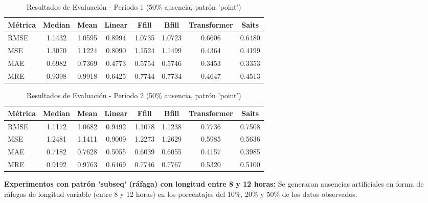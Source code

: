 \begin{table}[htbp]
\centering
\caption{Resultados de Evaluación - Periodo 1 (50\% ausencia, patrón 'point')}
\label{tab:poqueira_50_point_per1}
\begin{tabular}{l*{7}{S[table-format=1.4]}}
\toprule
\textbf{Métrica} & \textbf{Median} & \textbf{Mean} & \textbf{Linear} & \textbf{Ffill} & \textbf{Bfill} & \textbf{Transformer} & \textbf{Saits} \\
\midrule
RMSE & 1.1432 & 1.0595 & 0.8994 & 1.0735 & 1.0723 & 0.6606 & 0.6480 \\
MSE  & 1.3070 & 1.1224 & 0.8090 & 1.1524 & 1.1499 & 0.4364 & 0.4199 \\
MAE  & 0.6982 & 0.7369 & 0.4773 & 0.5754 & 0.5746 & 0.3453 & 0.3353 \\
MRE  & 0.9398 & 0.9918 & 0.6425 & 0.7744 & 0.7734 & 0.4647 & 0.4513 \\
\bottomrule
\end{tabular}
\end{table}

\begin{table}[htbp]
\centering
\caption{Resultados de Evaluación - Periodo 2 (50\% ausencia, patrón 'point')}
\label{tab:poqueira_50_point_per2}
\begin{tabular}{l*{7}{S[table-format=1.4]}}
\toprule
\textbf{Métrica} & \textbf{Median} & \textbf{Mean} & \textbf{Linear} & \textbf{Ffill} & \textbf{Bfill} & \textbf{Transformer} & \textbf{Saits} \\
\midrule
RMSE & 1.1172 & 1.0682 & 0.9492 & 1.1078 & 1.1238 & 0.7736 & 0.7508 \\
MSE  & 1.2481 & 1.1411 & 0.9009 & 1.2273 & 1.2629 & 0.5985 & 0.5636 \\
MAE  & 0.7182 & 0.7628 & 0.5055 & 0.6039 & 0.6055 & 0.4157 & 0.3985 \\
MRE  & 0.9192 & 0.9763 & 0.6469 & 0.7746 & 0.7767 & 0.5320 & 0.5100 \\
\bottomrule
\end{tabular}
\end{table}

\clearpage
\textbf{Experimentos con patrón 'subseq' (ráfaga) con longitud entre 8 y 12 horas:}
Se generaron ausencias artificiales en forma de ráfagas de longitud variable (entre 8 y 12 horas) en los porcentajes del 10\%, 20\% y 50\% de los datos observados.

